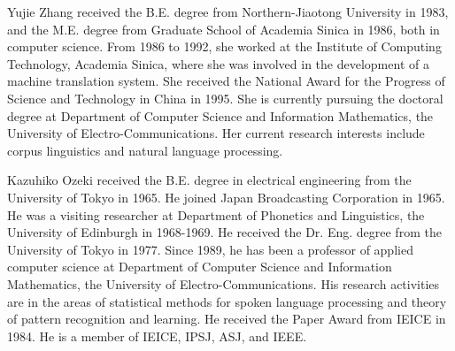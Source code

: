 \begin{biography}

\biotitle{}

{
Yujie Zhang received the B.E. degree from Northern-Jiaotong  University
in 1983, and the M.E. degree from  Graduate School of Academia Sinica
in 1986, both in computer science.
From 1986 to 1992, she worked at  the Institute of Computing Technology,
 Academia  Sinica,
where she was involved in the development of a machine translation  system.
 She received the 
National Award for the Progress of Science and Technology in China in 1995.
She is currently pursuing the doctoral degree at Department of Computer
 Science and
 Information Mathematics, the  University of Electro-Communications.
Her current research interests include corpus linguistics and  natural
 language processing.
}

{Kazuhiko Ozeki received the B.E. degree in electrical engineering
from the University of Tokyo in  1965. He joined  Japan Broadcasting
 Corporation in  1965. He was
a visiting researcher at Department of Phonetics and Linguistics,
 the University of Edinburgh in 1968-1969.
He received the Dr. Eng. degree from the University of Tokyo in 1977.
Since 1989, he has been a professor of applied computer science
 at Department of Computer Science and Information Mathematics,
the  University of Electro-Communications. 
 His research activities are in the areas of 
 statistical methods for spoken language processing 
and theory of pattern recognition and learning. He received the Paper Award 
from IEICE in 1984. He is a member of IEICE, IPSJ, ASJ, and IEEE.
}


\end{biography}




